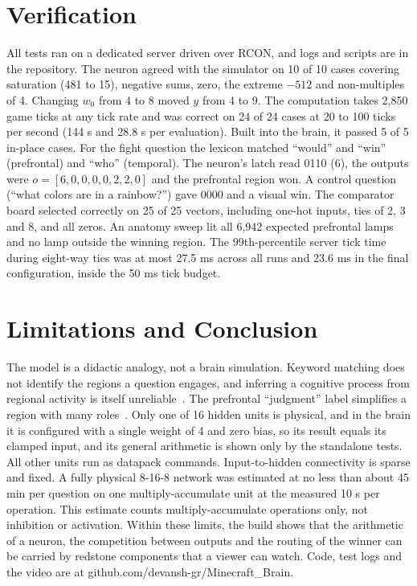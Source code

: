 \documentclass[conference]{IEEEtran}
\begin{document}
\section{Verification}
All tests ran on a dedicated server driven over RCON, and logs and scripts are in the repository. The neuron agreed with the simulator on 10 of 10 cases covering saturation (481 to 15), negative sums, zero, the extreme $-512$ and non-multiples of 4. Changing $w_0$ from 4 to 8 moved $y$ from 4 to 9. The computation takes 2,850 game ticks at any tick rate and was correct on 24 of 24 cases at 20 to 100 ticks per second (144 s and 28.8 s per evaluation). Built into the brain, it passed 5 of 5 in-place cases. For the fight question the lexicon matched ``would'' and ``win'' (prefrontal) and ``who'' (temporal). The neuron's latch read 0110 (6), the outputs were $o = [6,0,0,0,0,2,2,0]$ and the prefrontal region won. A control question (``what colors are in a rainbow?'') gave 0000 and a visual win. The comparator board selected correctly on 25 of 25 vectors, including one-hot inputs, ties of 2, 3 and 8, and all zeros. An anatomy sweep lit all 6,942 expected prefrontal lamps and no lamp outside the winning region. The 99th-percentile server tick time during eight-way ties was at most 27.5 ms across all runs and 23.6 ms in the final configuration, inside the 50 ms tick budget.

\section{Limitations and Conclusion}
The model is a didactic analogy, not a brain simulation. Keyword matching does not identify the regions a question engages, and inferring a cognitive process from regional activity is itself unreliable~\cite{poldrack}. The prefrontal ``judgment'' label simplifies a region with many roles~\cite{miller}. Only one of 16 hidden units is physical, and in the brain it is configured with a single weight of 4 and zero bias, so its result equals its clamped input, and its general arithmetic is shown only by the standalone tests. All other units run as datapack commands. Input-to-hidden connectivity is sparse and fixed. A fully physical 8-16-8 network was estimated at no less than about 45 min per question on one multiply-accumulate unit at the measured 10 s per operation. This estimate counts multiply-accumulate operations only, not inhibition or activation. Within these limits, the build shows that the arithmetic of a neuron, the competition between outputs and the routing of the winner can be carried by redstone components that a viewer can watch. Code, test logs and the video are at github.com/devansh-gr/Minecraft\_Brain.
\end{document}
